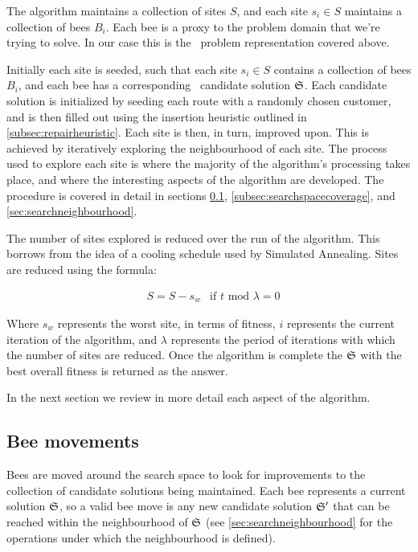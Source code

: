 The algorithm maintains a collection of sites $S$, and each site $s_i \in S$ maintains a collection of bees $B_i$. Each bee is a proxy to the problem domain that we're trying to solve. In our case this is the \VRP\ problem representation covered above.

Initially each site is seeded, such that each site $s_i \in S$ contains a collection of bees $B_i$, and each bee has a corresponding \VRP\ candidate solution $\mathfrak{S}$. Each candidate solution is initialized by seeding each route with a randomly chosen customer, and is then filled out using the insertion heuristic outlined in \ref{subsec:repairheuristic}. Each site is then, in turn, improved upon. This is achieved by iteratively exploring the neighbourhood of each site. The process used to explore each site is where the majority of the algorithm's processing takes place, and where the interesting aspects of the algorithm are developed. The procedure is covered in detail in sections \ref{sec:beemovement}, \ref{subsec:searchspacecoverage}, and \ref{sec:searchneighbourhood}.

The number of sites explored is reduced over the run of the algorithm. This borrows from the idea of a cooling schedule used by Simulated Annealing. Sites are reduced using the formula:

\begin{align}
   & S = S - s_w & \text{if $t \text{ mod } \lambda = 0$}
\end{align}

Where $s_w$ represents the worst site, in terms of fitness, $i$ represents the current iteration of the algorithm, and $\lambda$ represents the period of iterations with which the number of sites are reduced. Once the algorithm is complete the $\mathfrak{S}$ with the best overall fitness is returned as the answer.

In the next section we review in more detail each aspect of the algorithm. 

\subsection{Bee movements}
\label{sec:beemovement}

Bees are moved around the search space to look for improvements to the collection of candidate solutions being maintained. Each bee represents a current solution $\mathfrak{S}$, so a valid bee move is any new candidate solution $\mathfrak{S}'$ that can be reached within the neighbourhood of $\mathfrak{S}$ (see \ref{sec:searchneighbourhood} for the operations under which the neighbourhood is defined).

